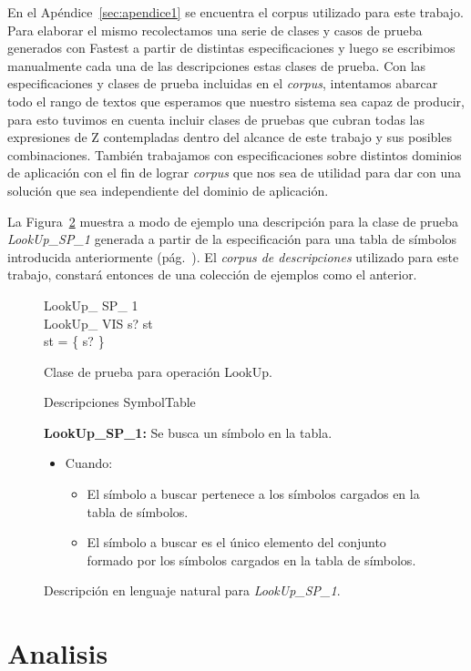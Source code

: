 En el Apéndice~\ref{sec:apendice1} se encuentra el corpus utilizado para este trabajo. Para elaborar el mismo recolectamos una serie de clases y casos de prueba generados con Fastest a partir de distintas especificaciones y luego se escribimos manualmente cada una de las descripciones estas clases de prueba. Con las especificaciones y clases de prueba incluidas en el \emph{corpus}, intentamos abarcar todo el rango de textos que esperamos que nuestro sistema sea capaz de producir, para esto tuvimos en cuenta incluir clases de pruebas que cubran todas las expresiones de Z contempladas dentro del alcance de este trabajo y sus posibles combinaciones. También trabajamos con especificaciones sobre distintos dominios de aplicación con el fin de lograr \emph{corpus} que nos sea de utilidad para dar con una solución que sea independiente del dominio de aplicación.

La Figura~\ref{fig:ej_desc_lookup_sp_1} muestra a modo de ejemplo una descripción para la clase de prueba \emph{LookUp\_SP\_1} generada a partir de la especificación para una tabla de símbolos introducida anteriormente (pág.~\pageref{fig:spec_symbol_table}). 
El \emph{corpus de descripciones} utilizado para este trabajo, constará entonces de una colección de ejemplos como el anterior.


\begin{figure}[H]
  \centering
   \begin{schema}{LookUp\_ SP\_ 1}\\
  		LookUp\_ VIS 
  		\where
  	 	s? \in \dom st \\
 		\dom st = \{ s? \}
  	\end{schema}
  \caption{Clase de prueba para operación LookUp.}
  \label{fig:ej_lookup_sp_1}
\end{figure}

\begin{figure}[H]
Descripciones SymbolTable 

\bigskip
\textbf{LookUp\_SP\_1:} Se busca un símbolo en la tabla.  
  \begin{itemize}
   \item{Cuando:}
   \begin{itemize}
  	  \item{El símbolo a buscar pertenece a los símbolos cargados en la tabla de símbolos.}
  	  \item{El símbolo a buscar es el único elemento del conjunto formado por los símbolos cargados en la tabla de símbolos.}   
   \end{itemize}
  \end{itemize}
  \caption{Descripción en lenguaje natural para \emph{LookUp\_SP\_1}.}
  \label{fig:ej_desc_lookup_sp_1}
\end{figure}

\section{Analisis}
\label{sec:corpus_analisis}
